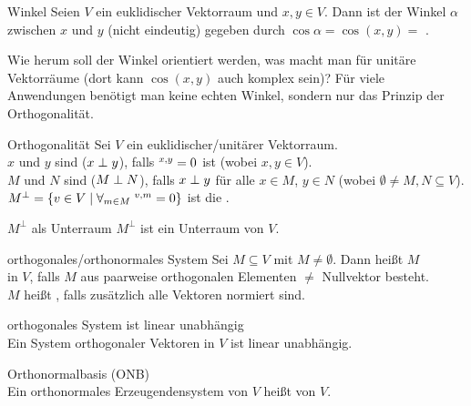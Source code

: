 \begin{Def}{Winkel}
    Seien $V$ ein euklidischer Vektorraum und $x, y \in V$.
    Dann ist der Winkel $\alpha$ zwischen $x$ und $y$ (nicht eindeutig) gegeben
    durch $\cos \alpha = \cos(x, y) =$
    .
\end{Def}

\begin{Bem}
    Wie herum soll der Winkel orientiert werden, was macht man für unitäre
    Vektorräume (dort kann $\cos(x, y)$ auch komplex sein)?
    Für viele Anwendungen benötigt man keine echten Winkel, sondern nur das
    Prinzip der Orthogonalität.
\end{Bem}

\begin{Def}{Orthogonalität}
    Sei $V$ ein euklidischer/unitärer Vektorraum. \\
    $x$ und $y$ sind  ($x \;\bot\; y$), falls
    $\sp{x, y} = 0$ ist (wobei $x, y \in V$). \\
    $M$ und $N$ sind  ($M \;\bot\; N$), falls $x \;\bot\; y$ für
    alle $x \in M$, $y \in N$ (wobei $\emptyset \not= M, N \subseteq V$). \\
    $M^\bot = \{v \in V \;|\; \forall_{m \in M}\; \sp{v, m} = 0\}$ ist die
    .
\end{Def}

\begin{Lemma}{$M^\bot$ als Unterraum}
    $M^\bot$ ist ein Unterraum von $V$.
\end{Lemma}

\begin{Def}{orthogonales/orthonormales System}
    Sei $M \subseteq V$ mit $M \not= \emptyset$.
    Dann heißt $M$ \\
     in $V$, falls
    $M$ aus paarweise orthogonalen Elementen $\not=$ Nullvektor besteht. \\
    $M$ heißt , falls zusätzlich alle Vektoren
    normiert sind.
\end{Def}

\begin{Satz}{orthogonales System ist linear unabhängig} \\
    Ein System orthogonaler Vektoren in $V$ ist linear unabhängig.
\end{Satz}

\begin{Def}{Orthonormalbasis (ONB)} \\
    Ein orthonormales Erzeugendensystem von $V$ heißt
     von $V$.
\end{Def}

